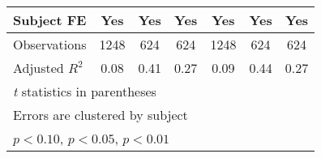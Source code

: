\begin{table}[htbp]
\begin{tabular}{l*{6}{c}}
Subject FE      &      Yes         &      Yes         &      Yes         &      Yes         &      Yes         &      Yes         \\
\hline
Observations    &     1248         &      624         &      624         &     1248         &      624         &      624         \\
Adjusted \(R^{2}\)&     0.08         &     0.41         &     0.27         &     0.09         &     0.44         &     0.27         \\
\hline\hline
\multicolumn{7}{l}{\footnotesize \textit{t} statistics in parentheses}\\
\multicolumn{7}{l}{\footnotesize Errors are clustered by subject}\\
\multicolumn{7}{l}{\footnotesize \sym{*} \(p<0.10\), \sym{**} \(p<0.05\), \sym{***} \(p<0.01\)}\\
\end{tabular}
\end{table}
